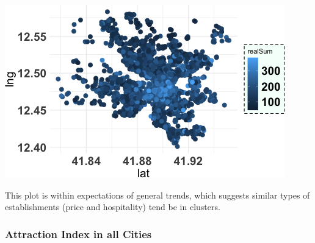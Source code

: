 \documentclass[
]{article}
\begin{document}
\includegraphics{Project_files/figure-latex/unnamed-chunk-30-1.png}

This plot is within expectations of general trends, which suggests
similar types of establishments (price and hospitality) tend be in
clusters.

\hypertarget{attraction-index-in-all-cities}{%
\subsubsection{Attraction Index in all
Cities}\label{attraction-index-in-all-cities}}
\end{document}
